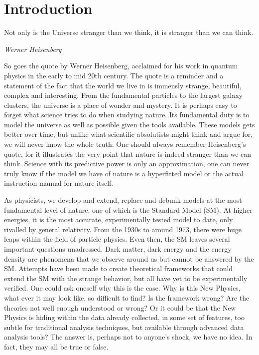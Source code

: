\chapter*{Introduction}

\epigraph{Not only is the Universe stranger than we think, it is stranger than we can think.}{\textit{Werner Heisenberg}\cite{heisenberg}}
So goes the quote by Werner Heisenberg, acclaimed for his work in quantum physics in the early to mid 
20th century. The quote is a reminder and a statement of the fact that the world we live in is immensly 
strange, beautiful, complex and interesting. From the fundamental particles to the largest galaxy clusters, 
the universe is a place of wonder and mystery. It is perhaps easy to forget what science tries to do
when studying nature. Its fundamental duty is to model the universe as well as possible given the tools 
available. These models gets better over time, but unlike what scientific absolutists might think and 
argue for, we will never know the whole truth. One should always remember Heisenberg's quote, for it
illustrates the very point that nature is indeed stranger than we can think. Science with its 
predictive power is only an approximation, one can never truly know if the model we have of nature is 
a hyperfitted model or the actual instruction manual for nature itself. \par 
As physicists, we develop 
and extend, replace and debunk models at the most fundamental level of nature, one of which is
the Standard Model (SM). At higher energies, it is the most accurate, experimentally tested model to date,
only rivalled by general relativity. From the 1930s to around 1973, there were huge leaps within the field
of particle physics. Even then, the SM leaves several important questions unadressed. Dark matter, dark energy
and the energy density are phenomena that we observe around us but cannot be answered by the SM. 
Attempts have been made to create theoretical frameworks that could extend the SM with the strange behavior, 
but all have yet to be experimentally verified. One could ask oneself why 
this is the case. Why is this New Physics, what ever it may look like, so difficult to find? 
Is the framework wrong? Are the theories not well enough understood or wrong? Or it could be that
the New Physics is hiding within the data already collected, in some set of features, too subtle for
traditional analysis techniques, but available through advanced data analysis tools? The answer is, perhaps not to 
anyone's shock, we have no idea. In fact, they may all be true or false.\par 
